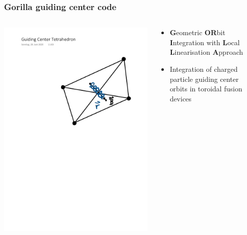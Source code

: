 \documentclass{beamer}
\begin{document}
\begin{frame}
\frametitle{\textbf{Gorilla} guiding center code}
\begin{columns}[onlytextwidth]
	\begin{column}{0.5\textwidth}

		\begin{center}
	\includegraphics[trim={5cm 13cm 1cm 4cm},clip,width=1\textwidth]{FIGURES/guiding_center_drawn2.pdf}
\end{center}
\end{column}
	\begin{column}{0.50\textwidth}
			\begin{center}
	\begin{itemize}
		\item \textbf{G}eometric \textbf{OR}bit \textbf{I}ntegration with \textbf{L}ocal \textbf{L}inearisation \textbf{A}pproach
		\item Integration of charged particle guiding center orbits in toroidal fusion devices
	\end{itemize}
\end{center}
	\end{column}
	\end{columns}
\end{frame}
\end{document}
